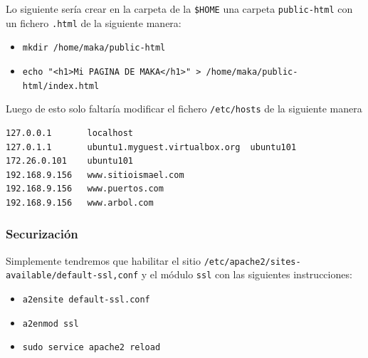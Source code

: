 \documentclass[11pt]{article}
\begin{document}
Lo siguiente sería crear en la carpeta de la \texttt{\$HOME} una carpeta \texttt{public-html} con un fichero \texttt{.html} de la siguiente manera:
\begin{itemize}
\item \texttt{mkdir /home/maka/public-html}
\item \texttt{echo "<h1>Mi PAGINA DE MAKA</h1>" > /home/maka/public-html/index.html}
\end{itemize}

Luego de esto solo faltaría modificar el fichero \texttt{/etc/hosts} de la siguiente manera
\begin{verbatim}
127.0.0.1       localhost
127.0.1.1       ubuntu1.myguest.virtualbox.org  ubuntu101
172.26.0.101    ubuntu101
192.168.9.156   www.sitioismael.com
192.168.9.156   www.puertos.com
192.168.9.156   www.arbol.com
\end{verbatim}
\subsubsection{Securización}
\label{sec:org4ef3afe}
Simplemente tendremos que habilitar el sitio \texttt{/etc/apache2/sites-available/default-ssl,conf} y el módulo \texttt{ssl} con las siguientes instrucciones:
\begin{itemize}
\item \texttt{a2ensite default-ssl.conf}
\item \texttt{a2enmod ssl}
\item \texttt{sudo service apache2 reload}
\end{itemize}
\end{document}
